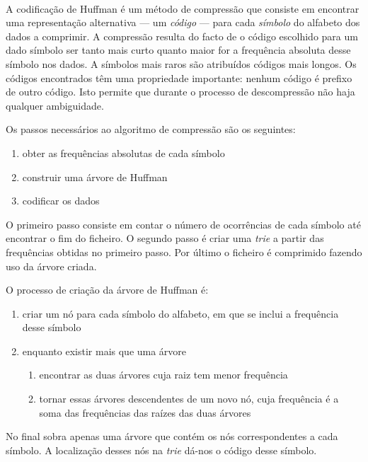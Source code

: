 \paragraph{} A codificação de Huffman é um método de compressão que consiste em encontrar uma representação alternativa --- um \emph{código} --- para cada \emph{símbolo} do alfabeto dos dados a comprimir. A compressão resulta do facto de o código escolhido para um dado símbolo ser tanto mais curto quanto maior for a frequência absoluta desse símbolo nos dados. A símbolos mais raros são atribuídos códigos mais longos. Os códigos encontrados têm uma propriedade importante: nenhum código é prefixo de outro código. Isto permite que durante o processo de descompressão não haja qualquer ambiguidade.

Os passos necessários ao algoritmo de compressão são os seguintes:

\begin{enumerate}
  \item obter as frequências absolutas de cada símbolo
  \item construir uma árvore de Huffman
  \item codificar os dados
\end{enumerate}

O primeiro passo consiste em contar o número de ocorrências de cada símbolo até encontrar o fim do ficheiro. O segundo passo é criar uma \emph{trie} a partir das frequências obtidas no primeiro passo. Por último o ficheiro é comprimido fazendo uso da árvore criada.

O processo de criação da árvore de Huffman é:

\begin{enumerate}
  \item criar um nó para cada símbolo do alfabeto, em que se inclui a frequência desse símbolo
  \item enquanto existir mais que uma árvore
    \begin{enumerate}
    \item encontrar as duas árvores cuja raiz tem menor frequência
    \item tornar essas árvores descendentes de um novo nó, cuja frequência é a soma das frequências das raízes das duas árvores
  \end{enumerate}
\end{enumerate}

No final sobra apenas uma árvore que contém os nós correspondentes a cada símbolo. A localização desses nós na \textit{trie} dá-nos o código desse símbolo.

